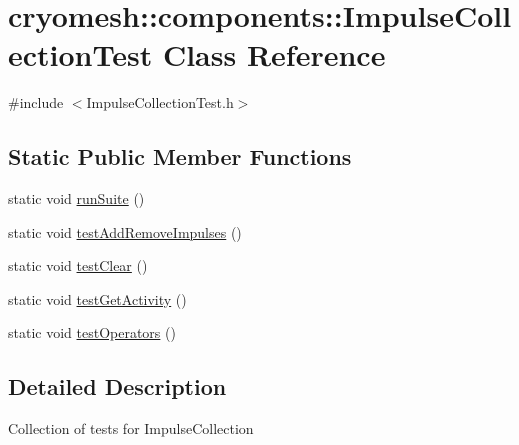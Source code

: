 \hypertarget{classcryomesh_1_1components_1_1_impulse_collection_test}{
\section{cryomesh::components::ImpulseCollectionTest Class Reference}
\label{classcryomesh_1_1components_1_1_impulse_collection_test}
}


{\ttfamily \#include $<$ImpulseCollectionTest.h$>$}

\subsection*{Static Public Member Functions}
\begin{DoxyCompactItemize}
\item 
static void \hyperlink{classcryomesh_1_1components_1_1_impulse_collection_test_a5f1a65b6809e590a5f61fdac8270980f}{runSuite} ()
\item 
static void \hyperlink{classcryomesh_1_1components_1_1_impulse_collection_test_abf43f9a14bc655307ea996a3165914fe}{testAddRemoveImpulses} ()
\item 
static void \hyperlink{classcryomesh_1_1components_1_1_impulse_collection_test_ac4495af7ab2857295d14b479ee86ab2a}{testClear} ()
\item 
static void \hyperlink{classcryomesh_1_1components_1_1_impulse_collection_test_a39f5cdc7c00668f772230e80264215cb}{testGetActivity} ()
\item 
static void \hyperlink{classcryomesh_1_1components_1_1_impulse_collection_test_aa48e2413cef48b15c58b6e2f05480fc9}{testOperators} ()
\end{DoxyCompactItemize}


\subsection{Detailed Description}
Collection of tests for ImpulseCollection 

